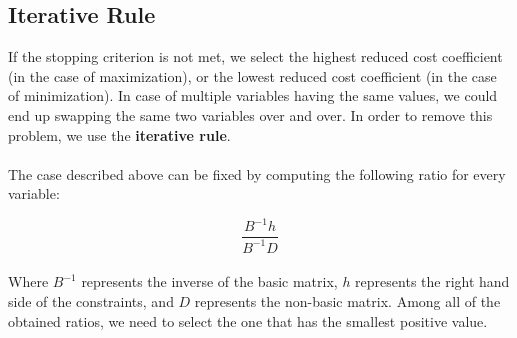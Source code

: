 \documentclass{article}
\begin{document}
\subsection{Iterative Rule}
If the stopping criterion is not met, we select the highest reduced cost coefficient (in the case of maximization), or the lowest reduced cost coefficient (in the case of minimization). In case of multiple variables having the same values, we could end up swapping the same two variables over and over. In order to remove this problem, we use the \textbf{iterative rule}. \\ \\
The case described above can be fixed by computing the following ratio for every variable:

\[ \frac{B^{-1}h}{B^{-1}D} \] \\
Where $B^{-1}$ represents the inverse of the basic matrix, $h$ represents the right hand side of the constraints, and $D$ represents the non-basic matrix. Among all of the obtained ratios, we need to select the one that has the smallest positive value.
\end{document}
